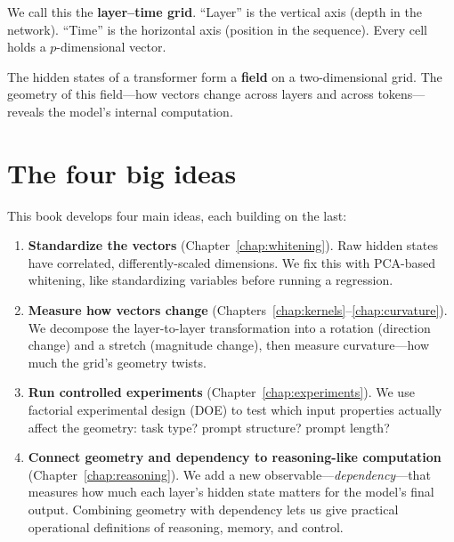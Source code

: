 \documentclass[11pt, twoside, openright]{memoir}
\begin{document}
We call this the \textbf{layer--time grid}. ``Layer'' is the vertical axis
(depth in the network). ``Time'' is the horizontal axis (position in the
sequence). Every cell holds a $p$-dimensional vector.

\begin{keyidea}
The hidden states of a transformer form a \textbf{field} on a
two-dimensional grid. The geometry of this field---how vectors change across
layers and across tokens---reveals the model's internal computation.
\end{keyidea}

\section{The four big ideas}

This book develops four main ideas, each building on the last:

\begin{enumerate}
\item \textbf{Standardize the vectors} (Chapter~\ref{chap:whitening}).
  Raw hidden states have correlated, differently-scaled dimensions.
  We fix this with PCA-based whitening, like standardizing variables
  before running a regression.

\item \textbf{Measure how vectors change} (Chapters~\ref{chap:kernels}--\ref{chap:curvature}).
  We decompose the layer-to-layer transformation into a rotation
  (direction change) and a stretch (magnitude change), then measure
  curvature---how much the grid's geometry twists.

\item \textbf{Run controlled experiments} (Chapter~\ref{chap:experiments}).
  We use factorial experimental design (DOE) to test which input
  properties actually affect the geometry: task type? prompt structure?
  prompt length?

\item \textbf{Connect geometry and dependency to reasoning-like computation}
  (Chapter~\ref{chap:reasoning}).
  We add a new observable---\emph{dependency}---that measures how much
  each layer's hidden state matters for the model's final output.
  Combining geometry with dependency lets us give practical operational
  definitions of reasoning, memory, and control.
\end{enumerate}
\end{document}

